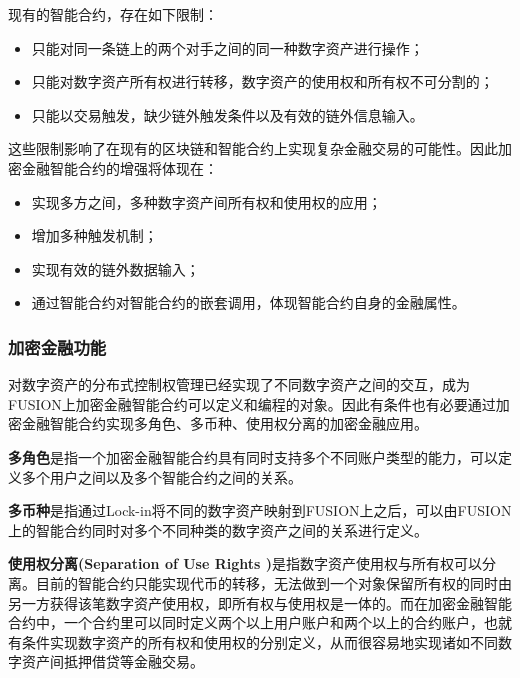 \documentclass[a4paper,12pt]{article}
\begin{document}
现有的智能合约，存在如下限制：

\begin{itemize}[itemindent=1em]
	\item 只能对同一条链上的两个对手之间的同一种数字资产进行操作；
	\item 只能对数字资产所有权进行转移，数字资产的使用权和所有权不可分割的；
	\item 只能以交易触发，缺少链外触发条件以及有效的链外信息输入。
\end{itemize}

这些限制影响了在现有的区块链和智能合约上实现复杂金融交易的可能性。因此加密金融智能合约的增强将体现在：

\begin{itemize}[itemindent=1em]
	\item 实现多方之间，多种数字资产间所有权和使用权的应用；
	\item 增加多种触发机制；
	\item 实现有效的链外数据输入；
	\item 通过智能合约对智能合约的嵌套调用，体现智能合约自身的金融属性。
\end{itemize}

\subsubsection{加密金融功能}

对数字资产的分布式控制权管理已经实现了不同数字资产之间的交互，成为FUSION上加密金融智能合约可以定义和编程的对象。因此有条件也有必要通过加密金融智能合约实现多角色、多币种、使用权分离的加密金融应用。

{\bfseries 多角色}是指一个加密金融智能合约具有同时支持多个不同账户类型的能力，可以定义多个用户之间以及多个智能合约之间的关系。

{\bfseries 多币种}是指通过Lock-in将不同的数字资产映射到FUSION上之后，可以由FUSION上的智能合约同时对多个不同种类的数字资产之间的关系进行定义。

{\bfseries 使用权分离(Separation of Use Rights )}是指数字资产使用权与所有权可以分离。目前的智能合约只能实现代币的转移，无法做到一个对象保留所有权的同时由另一方获得该笔数字资产使用权，即所有权与使用权是一体的。而在加密金融智能合约中，一个合约里可以同时定义两个以上用户账户和两个以上的合约账户，也就有条件实现数字资产的所有权和使用权的分别定义，从而很容易地实现诸如不同数字资产间抵押借贷等金融交易。
\end{document}
